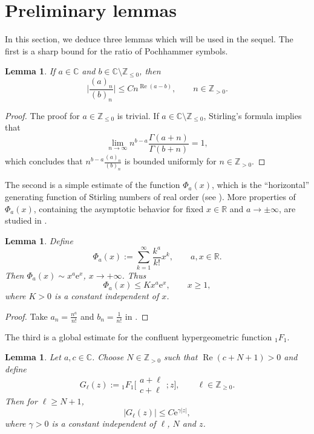 \documentclass[pdftex]{sigma}
\numberwithin{equation}{section}
\newtheorem{Lemma}[Theorem]{Lemma}
\newcommand{\CC}{\ensuremath{\mathbb{C}}}
\newcommand{\RR}{\ensuremath{\mathbb{R}}}
\newcommand{\ZZ}{\ensuremath{\mathbb{Z}}}
\newcommand{\me}{\mathrm{e}}
\begin{document}
\section{Preliminary lemmas}\label{Sect. 2}
In this section, we deduce three lemmas which will be used in the sequel. The first is a sharp bound for the ratio of Pochhammer symbols.
\begin{Lemma}\label{Lemma: ratio of Pochhammer symbol}
	If $a\in\CC$ and $b\in\CC\setminus\ZZ_{\leqslant 0}$, then
	\[\biggl|\frac{(a)_n}{(b)_n}\biggr|\leqslant Cn^{\operatorname{Re}(a-b)},\qquad n\in\ZZ_{>0}.\]
\end{Lemma}
\begin{proof}
	The proof for $a\in\ZZ_{\leqslant 0}$ is trivial. If $a\in\CC\setminus\ZZ_{\leqslant 0}$, Stirling's formula implies that
		\[\lim_{n\to\infty}n^{b-a}\frac{\Gamma(a+n)}{\Gamma(b+n)}=1,\]
		which concludes that $n^{b-a}\frac{(a)_n}{(b)_n}$ is bounded uniformly for $n\in\ZZ_{>0}$.
\end{proof}

The second is a simple estimate of the function $\Phi_a(x)$, which is the ``horizontal'' generating function of Stirling numbers of real order (see \cite[Section~8]{Butzer_Kilbas_Trujillo-2003}). More properties of $\Phi_a(x)$, containing the asymptotic behavior for fixed $x\in\RR$ and $a\to\pm\infty$, are studied in \cite[Section~3.2]{VanGorder-2009}.
\begin{Lemma}\label{Phi_a(x) estimate}
	Define
	\[\Phi_a(x):=\sum_{k=1}^{\infty}\frac{k^a}{k!}x^k,\qquad a,x\in\RR.\]
	Then $\Phi_a(x)\sim x^a\me^x$, $x\to +\infty$. Thus
	\[\Phi_a(x)\leqslant Kx^a\me^x,\qquad x\geqslant 1,\]
	where $K>0$ is a constant independent of $x$.
\end{Lemma}
\begin{proof}
	Take $a_n=\frac{n^a}{n!}$ and $b_n=\frac{1}{n!}$ in \cite[p.~12, Problem~72]{Polya_Szego-vol.2}.
\end{proof}

The third is a global estimate for the confluent hypergeometric function $_1F_1$.

\begin{Lemma}\label{lem-1F1}
	Let $a,c\in\CC$. Choose $N\in\ZZ_{>0}$ such that $\operatorname{Re}(c+N+1)>0$ and define
	\begin{equation}\label{G_l definition}
			G_{\ell}(z):={}_1F_1\bigg[\begin{matrix}
				a+\ell\\
				c+\ell
			\end{matrix};z\bigg],\qquad \ell\in\ZZ_{\geqslant 0}.
	\end{equation}
	Then for $\ell\geqslant N+1$,
 \begin{equation}\label{G_l inequality}
			|G_\ell(z)|\leqslant C\me^{\gamma|z|},
	\end{equation}
	where $\gamma>0$ is a constant independent of $\ell$, $N$ and $z$.
\end{Lemma}
\end{document}
